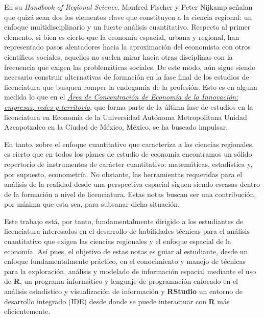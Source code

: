 \documentclass[
  11pt,
  oneside]{book}
\begin{document}
En su \emph{Handbook of Regional Science}, Manfred Fischer y Peter Nijkamp señalan que quizá sean dos los elementos clave que constituyen a la ciencia regional: un enfoque multidisciplinario y un fuerte análisis cuantitativo. Respecto al primer elemento, si bien es cierto que la economía espacial, urbana y regional, han representado pasos alentadores hacia la aproximación del economista con otros científicos sociales, aquellos no suelen mirar hacia otras disciplinas con la frecuencia que exigen las problemáticas sociales. De este modo, aún sigue siendo necesario construir alternativas de formación en la fase final de los estudios de licenciatura que busquen romper la endogamia de la profesión. Esto es en alguna medida lo que en el \href{https://rpm-uam.blogspot.com/p/docencia.html}{\emph{Área de Concentración de Economía de la Innovación: empresas, redes y territorio}}, que forma parte de la última fase de estudios en la licenciatura en Economía de la Universidad Autónoma Metropolitana Unidad Azcapotzalco en la Ciudad de México, México, se ha buscado impulsar.

En tanto, sobre el enfoque cuantitativo que caracteriza a las ciencias regionales, es cierto que en todos los planes de estudio de economía encontramos un sólido repertorio de instrumentos de carácter cuantitativo: matemáticas, estadística y, por supuesto, econometría. No obstante, las herramientas requeridas para el análisis de la realidad desde una perspectiva espacial siguen siendo escasas dentro de la formación a nivel de licenciatura. Estas notas buscan ser una contribución, por mínima que esta sea, para subsanar dicha situación.

Este trabajo está, por tanto, fundamentalmente dirigido a los estudiantes de licenciatura interesados en el desarrollo de habilidades técnicas para el análisis cuantitativo que exigen las ciencias regionales y el enfoque espacial de la economía. Así pues, el objetivo de estas notas es guiar al estudiante, desde un enfoque fundamentalmente práctico, en el conocimiento y manejo de técnicas para la exploración, análisis y modelado de información espacial mediante el uso de \textbf{R}, un programa informático y lenguaje de programación enfocado en el análisis estadístico y visualización de información y \textbf{RStudio} un entorno de desarrollo integrado (IDE) desde donde se puede interactuar con \textbf{R} más eficientemente.
\end{document}
